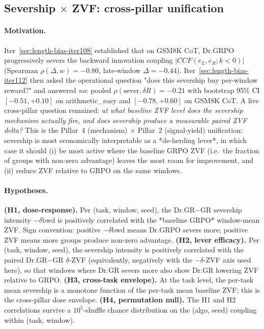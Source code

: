 
\subsection{Severship $\times$ ZVF: cross-pillar unification}
\label{sec:length-bias-iter116}

\paragraph{Motivation.}
Iter~\ref{sec:length-bias-iter108} established that on GSM8K CoT,
Dr.GRPO progressively severs the backward innovation coupling
$|CCF(e_L,e_R;k<0)|$ (Spearman $\rho(\Delta,w)=-0.80$,
late-window $\Delta=-0.44$).  Iter~\ref{sec:length-bias-iter112}
then asked the operational question "does this severship buy
per-window reward?" and answered \emph{no}: pooled
$\rho(\mathrm{sever},\delta R)=-0.21$ with bootstrap 95\% CI
$[-0.51,+0.10]$ on arithmetic\_easy and $[-0.78,+0.60]$ on GSM8K
CoT.  A live cross-pillar question remained: \emph{at what baseline
ZVF level does the severship mechanism actually fire, and does
severship produce a measurable paired ZVF delta?}  This is the
Pillar~4 (mechanism) $\times$ Pillar~2 (signal-yield) unification:
severship is most economically interpretable as a *de-herding
lever*, in which case it should (i) be most active where the baseline
GRPO ZVF (i.e.\ the fraction of groups with non-zero advantage)
leaves the most room for improvement, and (ii) reduce ZVF relative
to GRPO on the same windows.

\paragraph{Hypotheses.}
\textbf{(H1, dose-response).}  Per (task, window, seed), the
Dr.GR$-$GR severship intensity $-\delta\mathrm{bwd}$ is positively
correlated with the *baseline GRPO* window-mean ZVF.  Sign
convention: positive $-\delta\mathrm{bwd}$ means Dr.GRPO severs
more; positive ZVF means more groups produce non-zero advantage.
\textbf{(H2, lever efficacy).}  Per (task, window, seed), the
severship intensity is positively correlated with the paired
Dr.GR$-$GR $\delta$-ZVF (equivalently, negatively with the
$-\delta$-ZVF axis used here), so that windows where Dr.GR severs
more also show Dr.GR lowering ZVF relative to GRPO.  \textbf{(H3,
cross-task envelope).}  At the task level, the per-task mean
severship is a monotone function of the per-task mean baseline ZVF;
this is the cross-pillar dose envelope.  \textbf{(H4, permutation
null).}  The H1 and H2 correlations survive a $10^5$-shuffle chance
distribution on the (algo, seed) coupling within (task, window).

